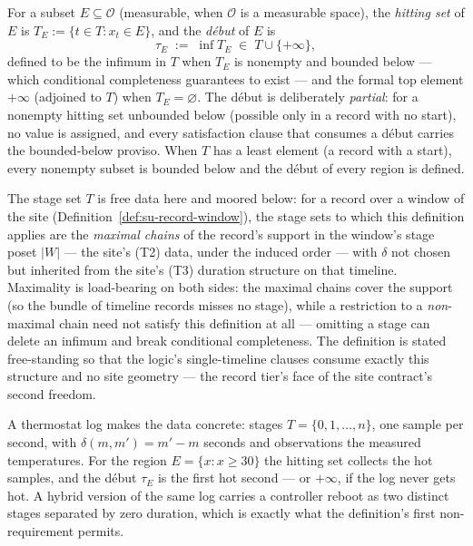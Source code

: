 \begin{definition}[Record]
For a subset $E \subseteq \mathcal{O}$ (measurable, when
$\mathcal{O}$ is a measurable space), the \emph{hitting set} of $E$ is
$T_E := \{t \in T : x_t \in E\}$, and the \emph{d\'ebut} of $E$ is
\[
  \tau_E \;:=\; \inf T_E \;\in\; T \cup \{+\infty\},
\]
defined to be the infimum in $T$ when $T_E$ is nonempty and bounded
below --- which conditional completeness guarantees to exist --- and
the formal top element $+\infty$ (adjoined to $T$) when
$T_E = \varnothing$. The d\'ebut is deliberately \emph{partial}: for
a nonempty hitting set unbounded below (possible only in a record
with no start), no value is assigned, and every satisfaction clause
that consumes a d\'ebut carries the bounded-below proviso. When $T$
has a least element (a record with a start), every nonempty subset is
bounded below and the d\'ebut of every region is defined.

The stage set $T$ is free data here and moored below: for a record
over a window of the site
(Definition~\ref{def:su-record-window}), the stage sets to which
this definition applies are the \emph{maximal chains} of the
record's support in the window's stage poset $|W|$ --- the site's
(T2) data, under the induced order --- with $\delta$ not chosen but
inherited from the site's (T3) duration structure on that timeline.
Maximality is load-bearing on both sides: the maximal chains cover
the support (so the bundle of timeline records misses no stage),
while a restriction to a \emph{non}-maximal chain need not satisfy
this definition at all --- omitting a stage can delete an infimum
and break conditional completeness. The definition is stated
free-standing so that the logic's single-timeline clauses consume
exactly this structure and no site geometry --- the record tier's
face of the site contract's second freedom.
\end{definition}

A thermostat log makes the data concrete: stages
$T = \{0, 1, \dots, n\}$, one sample per second, with
$\delta(m, m') = m' - m$ seconds and observations the measured
temperatures. For the region $E = \{x : x \ge 30\}$ the hitting set
collects the hot samples, and the d\'ebut $\tau_E$ is the first hot
second --- or $+\infty$, if the log never gets hot. A hybrid version
of the same log carries a controller reboot as two distinct stages
separated by zero duration, which is exactly what the definition's
first non-requirement permits.

